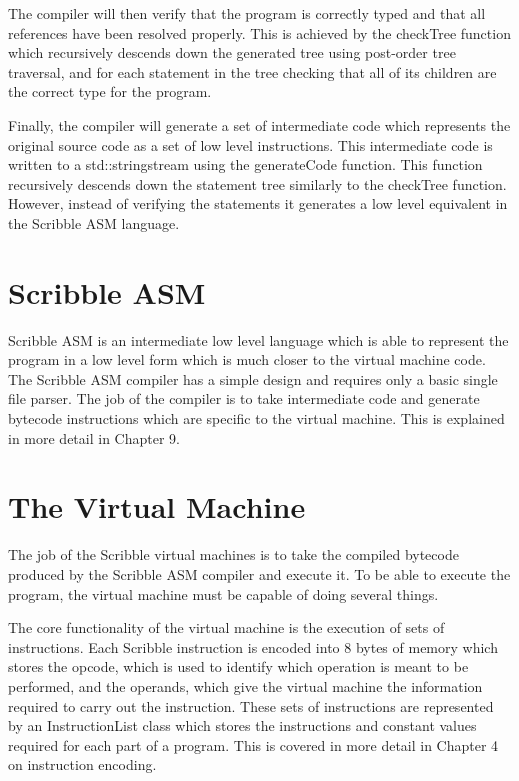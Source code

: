 \documentclass[]{final_report}
\begin{document}
The compiler will then verify that the program is correctly typed and that all references have been resolved properly. This is achieved by the checkTree function which recursively descends down the generated tree using post-order tree traversal, and for each statement in the tree checking that all of its children are the correct type for the program.

Finally, the compiler will generate a set of intermediate code which represents the original source code as a set of low level instructions. This intermediate code is written to a std::stringstream using the generateCode function. This function recursively descends down the statement tree similarly to the checkTree function. However, instead of verifying the statements it generates a low level equivalent in the Scribble ASM language.

\section{Scribble ASM}

Scribble ASM is an intermediate low level language which is able to represent the program in a low level form which is much closer to the virtual machine code. The Scribble ASM compiler has a simple design and requires only a basic single file parser. The job of the compiler is to take intermediate code and generate bytecode instructions which are specific to the virtual machine. This is explained in more detail in Chapter 9.

\section{The Virtual Machine}

The job of the Scribble virtual machines is to take the compiled bytecode produced by the Scribble ASM compiler and execute it. To be able to execute the program, the virtual machine must be capable of doing several things.

The core functionality of the virtual machine is the execution of sets of instructions. Each Scribble instruction is encoded into 8 bytes of memory which stores the opcode, which is used to identify which operation is meant to be performed, and the operands, which give the virtual machine the information required to carry out the instruction. These sets of instructions are represented by an InstructionList class which stores the instructions and constant values required for each part of a program. This is covered in more detail in Chapter 4 on instruction encoding.
\end{document}
